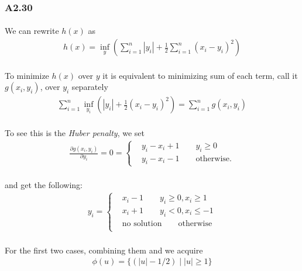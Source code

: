 \subsubsection*{A2.30}
\paragraph{}
We can rewrite $h(x)$ as
\begin{align*}
h(x) = \inf_y(\sum_{i=1}^{n}|y_i|+\frac{1}{2}\sum_{i=1}^{n}(x_i-y_i)^2)
\end{align*}
\paragraph{}
To minimize $h(x)$ over $y$ it is equivalent to minimizing sum of each term, call it $g(x_i,y_i)$, over $y_i$ separately
\begin{align*}
\sum_{i=1}^{n}\inf_{y_i}(|y_i|+\frac{1}{2}(x_i-y_i)^2) =\sum_{i=1}^{n}g(x_i,y_i)
\end{align*}
\paragraph{}
To see this is the \textit{Huber penalty}, we set
\begin{align*}
\frac{\partial g(x_i,y_i)}{\partial y_i} 
=0 =\begin{cases}
&y_i - x_i + 1 \qquad y_i \geq 0\\
&y_i - x_i - 1 \qquad \text{otherwise}.
\end{cases}
\end{align*}
\paragraph{}
and get the following:
\begin{align*}
y_i=\begin{cases}
& x_i - 1 \qquad y_i \geq 0, x_i \geq 1\\
& x_i + 1 \qquad y_i < 0, x_i \leq -1 \\
& \text{no solution} \qquad \text{otherwise}\\
\end{cases}
\end{align*}
\paragraph{}
For the first two cases, combining them and we acquire
\begin{align*}
\phi(u) = \{(|u|-1/2) \mid |u|\geq 1\}
\end{align*}
